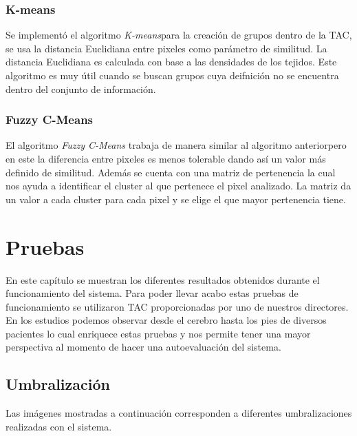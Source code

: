 \documentclass[12pt]{report}
\begin{document}
\subsection{K-means}
Se implementó el algoritmo \textit{K-means}para la creación de grupos dentro de la TAC, se usa la distancia Euclidiana entre pixeles como parámetro de similitud. La distancia Euclidiana es calculada con base a las densidades de los tejidos. Este algoritmo es muy útil cuando se buscan grupos cuya deifnición no se encuentra dentro del conjunto de información.

\subsection{Fuzzy C-Means}
El algoritmo \textit{Fuzzy C-Means} trabaja de manera similar al algoritmo anteriorpero en este la diferencia entre pixeles es menos tolerable dando así un valor más definido de similitud. Además se cuenta con una matriz de pertenencia la cual nos ayuda a identificar el cluster al que pertenece el pixel analizado. La matriz da un valor a cada cluster para cada pixel y se elige el que mayor pertenencia tiene.

\chapter{Pruebas}
En este capítulo se muestran los diferentes resultados obtenidos durante el funcionamiento del sistema. Para poder llevar acabo estas pruebas de funcionamiento se utilizaron TAC proporcionadas por uno de nuestros directores. En los estudios podemos observar desde el cerebro hasta los pies de diversos pacientes lo cual enriquece estas pruebas y nos permite tener una mayor perspectiva al momento de hacer una autoevaluación del sistema.

\section{Umbralización}
Las imágenes mostradas a continuación corresponden a diferentes umbralizaciones realizadas con el sistema.
\end{document}
